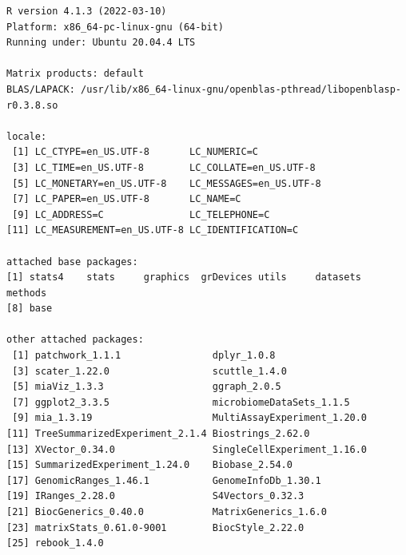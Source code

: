 \documentclass[
]{book}
\begin{document}
\begin{verbatim}
R version 4.1.3 (2022-03-10)
Platform: x86_64-pc-linux-gnu (64-bit)
Running under: Ubuntu 20.04.4 LTS

Matrix products: default
BLAS/LAPACK: /usr/lib/x86_64-linux-gnu/openblas-pthread/libopenblasp-r0.3.8.so

locale:
 [1] LC_CTYPE=en_US.UTF-8       LC_NUMERIC=C              
 [3] LC_TIME=en_US.UTF-8        LC_COLLATE=en_US.UTF-8    
 [5] LC_MONETARY=en_US.UTF-8    LC_MESSAGES=en_US.UTF-8   
 [7] LC_PAPER=en_US.UTF-8       LC_NAME=C                 
 [9] LC_ADDRESS=C               LC_TELEPHONE=C            
[11] LC_MEASUREMENT=en_US.UTF-8 LC_IDENTIFICATION=C       

attached base packages:
[1] stats4    stats     graphics  grDevices utils     datasets  methods  
[8] base     

other attached packages:
 [1] patchwork_1.1.1                dplyr_1.0.8                   
 [3] scater_1.22.0                  scuttle_1.4.0                 
 [5] miaViz_1.3.3                   ggraph_2.0.5                  
 [7] ggplot2_3.3.5                  microbiomeDataSets_1.1.5      
 [9] mia_1.3.19                     MultiAssayExperiment_1.20.0   
[11] TreeSummarizedExperiment_2.1.4 Biostrings_2.62.0             
[13] XVector_0.34.0                 SingleCellExperiment_1.16.0   
[15] SummarizedExperiment_1.24.0    Biobase_2.54.0                
[17] GenomicRanges_1.46.1           GenomeInfoDb_1.30.1           
[19] IRanges_2.28.0                 S4Vectors_0.32.3              
[21] BiocGenerics_0.40.0            MatrixGenerics_1.6.0          
[23] matrixStats_0.61.0-9001        BiocStyle_2.22.0              
[25] rebook_1.4.0                  


\end{verbatim}
\end{document}
